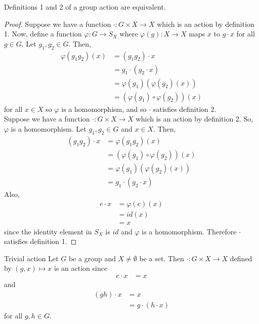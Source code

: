 \documentclass[12pt]{article}
\begin{document}
	\begin{myprop}{}{}
		Definitions 1 and 2 of a group action are equivalent.
		\begin{proof}
			Suppose we have a function $\cdot:G\times X\to X$ which is an action by definition 1. Now, define a function $\varphi:G\to S_X$ where $\varphi(g):X\to X$ maps $x$ to $g\cdot x$ for all $g\in G$. Let $g_1, g_2\in G$. Then,
			\begin{align*}
				\varphi(g_1g_2)(x)&=(g_1g_2)\cdot x\\
				&=g_1\cdot(g_2\cdot x)\\
				&=\varphi(g_1)(\varphi(g_2)(x))\\
				&=(\varphi(g_1)\circ\varphi(g_2))(x)
			\end{align*}
			for all $x\in X$ so $\varphi$ is a homomorphism, and so $\cdot$ satisfies definition 2.\\
			
			Suppose we have a function $\cdot:G\times X\to X$ which is an action by definition 2. So, $\varphi$ is a homomorphism. Let $g_1, g_2\in G$ and $x\in X$. Then,
			\begin{align*}
				(g_1g_2)\cdot x&=\varphi(g_1g_2)(x)\\
				&=(\varphi(g_1)\circ\varphi(g_2))(x)\\
				&=\varphi(g_1)(\varphi(g_2)(x))\\
				&=g_1\cdot(g_2\cdot x)
			\end{align*}
			Also,
			\begin{align*}
				e\cdot x&=\varphi(e)(x)\\
				&=id(x)\\
				&=x
			\end{align*}
			since the identity element in $S_X$ is $id$ and $\varphi$ is a homomorphism. Therefore $\cdot$ satisfies definition 1.
		\end{proof}
	\end{myprop}
	
	\begin{myex}{Trivial action}{}
		Let $G$ be a group and $X\neq\emptyset$ be a set. Then $\cdot:G\times X\to X$ defined by $(g, x)\mapsto x$ is an action since
		\begin{align*}
			e\cdot x&=x
		\end{align*}
		and
		\begin{align*}
			(gh)\cdot x&=x\\
			&=g\cdot(h\cdot x)
		\end{align*}
		for all $g, h\in G$.
	\end{myex}
	
\end{document}
